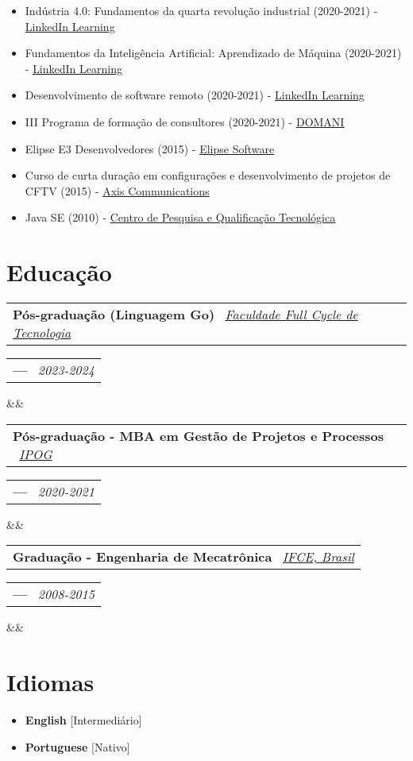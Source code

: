 \documentclass[11pt,a4paper,sans]{moderncv}
\makeatletter
\newcommand*{\customcventry}[7][.13em]{
\begin{tabular}{@{}l}
{\bfseries #4} \
{\itshape #3}
\end{tabular}
\hfill
\begin{tabular}{l@{}}
{\bfseries #5} \
{\itshape #2}
\end{tabular}
\ifx&#7&%
\else{\
\begin{minipage}{\maincolumnwidth}%
\small#7%
\end{minipage}}\fi%
\par\addvspace{#1}}
\makeatother
\begin{document}
{\begin{itemize}[label=\textbullet]
	  \item Indústria 4.0: Fundamentos da quarta revolução industrial (2020-2021) - \underline{\color{blue}\href{https://linkedin.com/learning}{LinkedIn Learning}}
	  \item Fundamentos da Inteligência Artificial: Aprendizado de Máquina (2020-2021) - \underline{\color{blue}\href{https://linkedin.com/learning}{LinkedIn Learning}}
	  \item Desenvolvimento de software remoto (2020-2021) - \underline{\color{blue}\href{https://linkedin.com/learning}{LinkedIn Learning}}
	  \item III Programa de formação de consultores (2020-2021) - \underline{\color{blue}\href{https://domani.com.br}{DOMANI}}
	  \item Elipse E3 Desenvolvedores (2015) - \underline{\color{blue}\href{https://elipse.com}{Elipse Software}}
	  \item Curso de curta duração em configurações e desenvolvimento de projetos de CFTV (2015) - \underline{\color{blue}\href{https://axis.com}{Axis Communications}}
	  \item Java SE (2010) - \underline{\color{blue}\href{https://cpqt.com.br}{Centro de Pesquisa e Qualificação Tecnológica}}
  \end{itemize}}

\section{Educação}
\customcventry{2023-2024}{{\color{blue}\href{https://fctech.edu.br}{Faculdade Full Cycle de Tecnologia}}}{Pós-graduação (Linguagem Go)}{---}{}{}
\customcventry{2020-2021}{{\color{blue}\href{https://www.ipog.edu.br}{IPOG}}}{Pós-graduação - MBA em Gestão de Projetos e Processos}{---}{}{}
\customcventry{2008-2015}{{\color{blue}\href{https://ifce.edu.br}{IFCE, Brasil}}}{Graduação - Engenharia de Mecatrônica}{---}{}{}

\section{Idiomas}
\begin{multicols}{2}
	\begin{itemize}[label=\textbullet]
		\item \textbf{English} [Intermediário]
		\item \textbf{Portuguese} [Nativo]
	\end{itemize}
\end{multicols}
\end{document}
